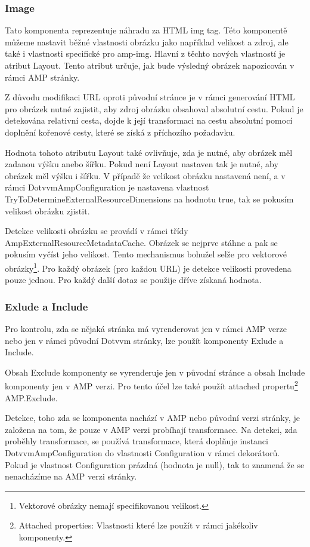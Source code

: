  \subsubsection{Image}
 Tato komponenta reprezentuje náhradu za HTML img tag. Této komponentě můžeme nastavit běžné vlastnosti obrázku jako například velikost a zdroj, ale také i vlastnosti specifické pro amp-img. Hlavní z těchto nových vlastností je atribut Layout. Tento atribut určuje, jak bude výsledný obrázek napozicován v rámci AMP stránky.
 
 Z důvodu modifikaci URL oproti původní stránce je v rámci generování HTML pro obrázek nutné zajistit, aby zdroj obrázku obsahoval absolutní cestu. Pokud je detekována relativní cesta, dojde k její transformaci na cestu absolutní pomocí doplnění kořenové cesty, které se získá z příchozího požadavku.
 
 Hodnota tohoto atributu Layout také ovlivňuje, zda je nutné, aby obrázek měl zadanou výšku anebo šířku. Pokud není Layout nastaven tak je nutné, aby obrázek měl výšku i šířku. V případě že velikost obrázku nastavená není, a v rámci DotvvmAmpConfiguration je nastavena vlastnost TryToDetermineExternalResourceDimensions na hodnotu true, tak se pokusím velikost obrázku zjistit.
 
 Detekce velikosti obrázku se provádí v rámci třídy AmpExternalResourceMetadataCache. Obrázek se nejprve stáhne a pak se pokusím vyčíst jeho velikost. Tento mechanismus bohužel selže pro vektorové obrázky\footnote{Vektorové obrázky nemají specifikovanou velikost.}. Pro každý obrázek (pro každou URL) je detekce velikosti provedena pouze jednou. Pro každý další dotaz se použije dříve získaná hodnota.
 
 \subsubsection{Exlude a Include}
 Pro kontrolu, zda se nějaká stránka má vyrenderovat jen v rámci AMP verze nebo jen v rámci původní Dotvvm stránky, lze použít komponenty Exlude a Include.
 
 Obsah Exclude komponenty se vyrenderuje jen v původní stránce a obsah Include komponenty jen v AMP verzi. Pro tento účel lze také použít attached propertu\footnote{Attached properties: Vlastnosti které lze použít v rámci jakékoliv komponenty.} AMP.Exclude.
 
 Detekce, toho zda se komponenta nachází v AMP nebo původní verzi stránky, je založena na tom, že pouze v AMP verzi probíhají transformace. Na detekci, zda proběhly transformace, se používá transformace, která doplňuje instanci DotvvmAmpConfiguration do vlastnosti Configuration v rámci dekorátorů. Pokud je vlastnost Configuration prázdná (hodnota je null), tak to znamená že se nenacházíme na AMP verzi stránky.
 

